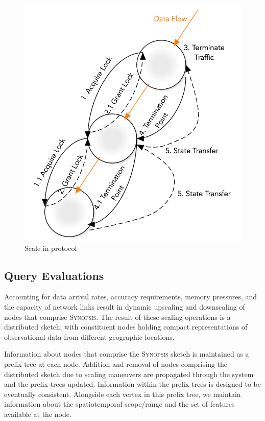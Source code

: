 \begin{figure}
    \centerline{\includegraphics[scale=0.55]{figures/scale-in-protocol.png}}
    \caption{Scale in protocol}
    \label{fig:scale-in-protocol}
\end{figure}

\subsection{Query Evaluations}
\label{subsec:query-eval}
Accounting for data arrival rates, accuracy requirements, memory pressures, and the capacity of network links result in dynamic upscaling and downscaling of nodes that comprise \textsc{Synopsis}. The result of these scaling operations is a distributed sketch, with constituent nodes holding compact representations of observational data from different geographic locations. 

Information about nodes that comprise the \textsc{Synopsis} sketch is maintained as a prefix tree at each node. Addition and removal of nodes comprising the distributed sketch due to scaling maneuvers are propagated through the system and the prefix trees updated. Information within the prefix trees is designed to be eventually consistent.  Alongside each vertex in this prefix tree, we maintain information about the spatiotemporal scope/range and the set of features available at the node.  

